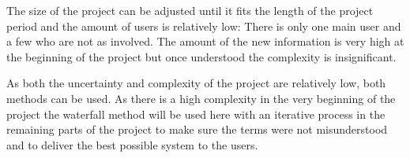 The size of the project can be adjusted until it fits the length of the project period and the amount of users is relatively low: There is only one main user and a few who are not as involved. The amount of the new information is very high at the beginning of the project but once understood the complexity is insignificant.

As both the uncertainty and complexity of the project are relatively low, both methods can be used. As there is a high complexity in the very beginning of the project the waterfall method will be used here with an iterative process in the remaining parts of the project to make sure the terms were not misunderstood and to deliver the best possible system to the users. %

